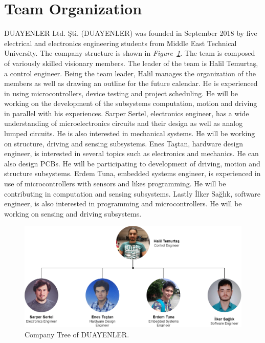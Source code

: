 \documentclass[a4paper,12pt]{article}
\begin{document}
\section{Team Organization}
DUAYENLER Ltd. Şti. (DUAYENLER) was founded in September 2018 by five electrical and electronics engineering students from Middle East Technical University. The company structure is shown in \textit{Figure~\ref{fig:company_tree}}. The team is composed of variously skilled visionary members. The leader of the team is Halil Temurtaş, a control engineer. Being the team leader, Halil manages the organization of the members as well as drawing an outline for the future calendar. He is experienced in using microcontrollers, device testing and project scheduling. He will be working on the development of the subsystems computation, motion and driving in parallel with his experiences. Sarper Sertel, electronics engineer, has a wide understanding of microelectronics circuits and their design as well as analog lumped circuits. He is also interested in mechanical systems. He will be working on structure, driving and sensing subsystems. Enes Taştan, hardware design engineer, is interested in several topics such as electronics and mechanics. He can also design PCBs. He will be participating to development of driving, motion and structure subsystems. Erdem Tuna, embedded systems engineer, is experienced in use of microcontrollers with sensors and likes programming. He will be contributing in computation and sensing subsystems. Lastly İlker Sağlık, software engineer, is also interested in programming and microcontrollers. He will be working on sensing and driving subsystems.

\begin{figure}[t!]
	\centering
	\includegraphics[width=\textwidth,height=\textheight,keepaspectratio]{../../Documents/company/company-tree} 
	\caption{\label{fig:company_tree}Company Tree of DUAYENLER.}
\end{figure}
\end{document}
